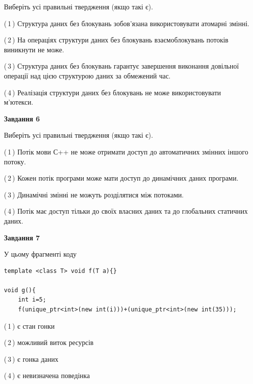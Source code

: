 \documentclass[12pt, ukrainian]{article}
\begin{document}
\begin {large}
{Виберіть усі правильні твердження (якщо такі є).\par
\vspace{2mm}

(\,1\,) Структура даних без блокувань зобов’язана використовувати атомарні змінні.%

(\,2\,) На операціях структури даних без блокувань взаємоблокувань потоків виникнути не може.%

(\,3\,) Структура даних без блокувань гарантує завершення виконання довільної операції над цією структурою даних за обмежений час.%

(\,4\,) Реалізація структури даних без блокувань не може використовувати м’ютекси.%
\newpage


\begin{center}
\textbf{Завдання 6}
\end{center}

Виберіть усі правильні твердження (якщо такі є).\par
\vspace{2mm}

(\,1\,) Потік мови С++ не може отримати доступ до автоматичних змінних іншого потоку.%

(\,2\,) Кожен потік програми може мати доступ до динамічних даних програми.%

(\,3\,) Динамічні змінні не можуть розділятися між потоками.%

(\,4\,) Потік має доступ тільки до своїх власних даних та до глобальних статичних даних.%


\begin{center}
\textbf{Завдання 7}
\end{center}

У цьому фрагменті коду
\begin{verbatim}
template <class T> void f(T a){}

void g(){
    int i=5;
    f(unique_ptr<int>(new int(i)))+(unique_ptr<int>(new int(35)));
\end{verbatim}
(\,1\,) є стан гонки%

(\,2\,) можливий виток ресурсів%

(\,3\,) є гонка даних%

(\,4\,) є невизначена поведінка%

}
\end {large}

\vspace{4mm}
\newpage
\end{document}

